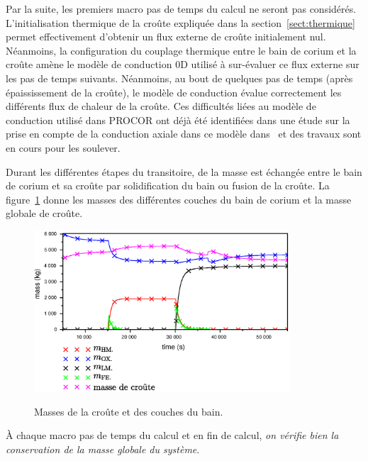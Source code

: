 Par la suite, les premiers macro pas de temps du calcul ne seront pas considérés. L'initialisation thermique de la croûte expliquée dans la section~\ref{sect:thermique} permet effectivement d'obtenir un flux externe de croûte initialement nul. Néanmoins, la configuration du couplage thermique entre le bain de corium et la croûte amène le modèle de conduction 0D utilisé à sur-évaluer ce flux externe sur les pas de temps suivants. Néanmoins, au bout de quelques pas de temps (après épaississement de la croûte), le modèle de conduction évalue correctement les différents flux de chaleur de la croûte. Ces difficultés liées au modèle de conduction utilisé dans PROCOR ont déjà été identifiées dans une étude sur la prise en compte de la conduction axiale dans ce modèle dans~\cite{Peybernes2018} et des travaux sont en cours pour les soulever.

Durant les différentes étapes du transitoire, de la masse est échangée entre le bain de corium et sa croûte par solidification du bain ou fusion de la croûte. La figure~\ref{fig:mass_balance} donne les masses des différentes couches du bain de corium et la masse globale de croûte.
\begin{figure}
\centering
\includegraphics[width=0.85\textwidth, keepaspectratio=true]{Figures/mass_balance.eps}\\
\caption{Masses de la croûte et des couches du bain.}
\label{fig:mass_balance}
\end{figure}
À chaque macro pas de temps du calcul et en fin de calcul, \emph{on vérifie bien la conservation de la masse globale du système}.

